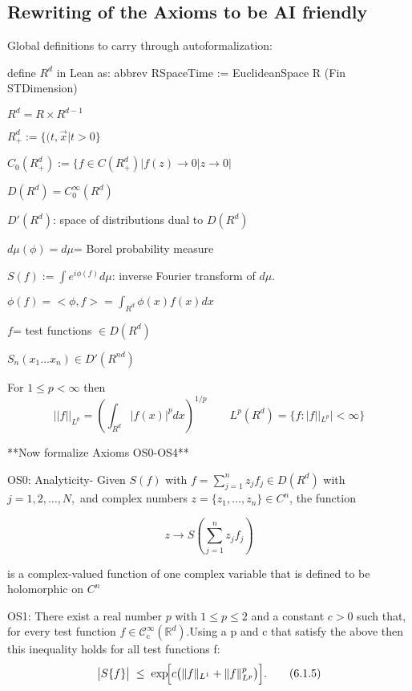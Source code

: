 \documentclass{article}
\newcommand{\1}{\mathbbm{1}}
\theoremstyle{plain}
\theoremstyle{definition}
\numberwithin{equation}{section}
\begin{document}
\subsection{Rewriting of the Axioms to be AI friendly}

Global definitions to carry through autoformalization:

define $R^d$ in Lean as: abbrev RSpaceTime := EuclideanSpace R (Fin STDimension)

$R^d = R \times R^{d-1}$

$R_+^d:= \{(t,\vec{x}| t> 0\}$

$C_0(R_+^d):= \{ f \in C(R_+^d)| f(z) \rightarrow 0 |z \rightarrow 0|$

$D(R^d)= C_0^{\infty} (R^d)$ 

$D'(R^d)$: space of distributions dual to $D(R^d)$

$d \mu (\phi)= d \mu$= Borel probability measure

$S(f):= \int e^{i \phi(f)} d \mu$: inverse Fourier transform of $d \mu$. 

$\phi(f) = < \phi, f>= \int_{R^d }\phi(x) f(x) dx$

$f$= test functions $\in D(R^d)$

$S_n(x_1 \ldots x_n) \in D'(R^{nd})$

For $1 \leq p < \infty$ then
\begin{equation}
    || f ||_{L^p}= (\int_{R^d} |f(x)|^p dx)^{1/p} \qquad L^p(R^d)= \{f: |f||_{L^p}| < \infty \}
\end{equation}

 **Now formalize Axioms OS0-OS4**

OS0: Analyticity-  Given $S (f) $ with $f = \sum_{j=1}^n z_j f_j \in D({R^d})$ with $j= 1,2, \ldots, N, $ and complex numbers $z= \{ z_1, \ldots, z_n\} \in C^n$, the function 

\begin{equation}
    z \rightarrow S (\sum_{j=1}^n  z_j f_j )
\end{equation}

is a complex-valued function of one complex variable that is defined to be holomorphic on $C^n$ 

OS1:
There exist a real number \(p\) with \(1\le p\le 2\) and a constant \(c>0\) such that, for every test function \(f\in\mathcal{C}^{\infty}_{\mathrm c}(\mathbb{R}^{d})\).Using a p and c that satisfy the above then this inequality holds for all test functions f:
\begin{equation}\label{eq:OS1}
\bigl|S\{f\}\bigr|
\;\le\;
\exp\!\Bigl[c\bigl(\|f\|_{L^{1}}+\|f\|_{L^{p}}^p\bigr)\Bigr].
\tag{6.1.5}
\end{equation}
\end{document}
